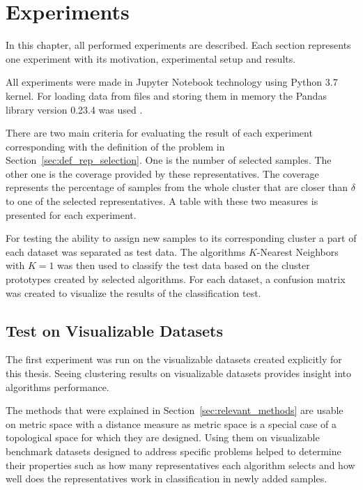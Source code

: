 \documentclass[thesis=B,english]{FITthesis}[2012/10/20]
\begin{document}

\chapter{Experiments}\label{ch:experiments}

In this chapter, all performed experiments are described.
Each section represents one experiment with its motivation, experimental setup and results.

All experiments were made in Jupyter Notebook technology using Python 3.7 kernel.
For loading data from files and storing them in memory the Pandas library version 0.23.4 was used \cite{mckinney2010data}.

There are two main criteria for evaluating the result of each experiment corresponding with the definition of the problem in Section~\ref{sec:def_rep_selection}.
One is the number of selected samples.
The other one is the coverage provided by these representatives.
The coverage represents the percentage of samples from the whole cluster that are closer than $\delta$ to one of the selected representatives.
A table with these two measures is presented for each experiment.

For testing the ability to assign new samples to its corresponding cluster a part of each dataset was separated as test data.
The algorithms $K$-Nearest Neighbors with $K=1$ was then used to classify the test data based on the cluster prototypes created by selected algorithms.
For each dataset, a confusion matrix was created to visualize the results of the classification test.

\section{Test on Visualizable Datasets}\label{sec:exp1}

The first experiment was run on the visualizable datasets created explicitly for this thesis.
Seeing clustering results on visualizable datasets provides insight into algorithms performance.

The methods that were explained in Section~\ref{sec:relevant_methods} are usable on metric space with a distance measure as metric space is a special case of a topological space for which they are designed.
Using them on visualizable benchmark datasets designed to address specific problems helped to determine their properties such as how many representatives each algorithm selects and how well does the representatives work in classification in newly added samples.
\end{document}
